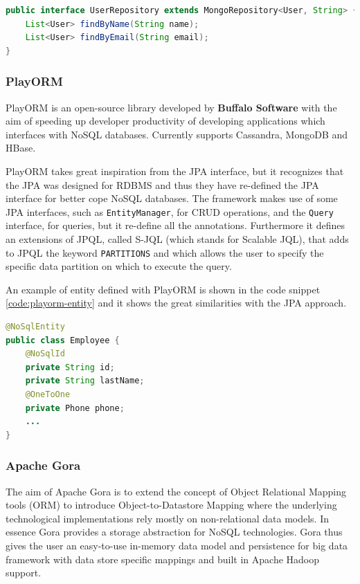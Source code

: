 \begin{lstlisting}[language=Java, caption=Spring Data repositories, label=code:spring-dao]
public interface UserRepository extends MongoRepository<User, String> {
    List<User> findByName(String name);
    List<User> findByEmail(String email);
}
\end{lstlisting}

\subsubsection{PlayORM}
PlayORM \cite{online:playorm} is an open-source library developed by \textbf{Buffalo Software} with the aim of speeding up developer productivity of developing applications which interfaces with NoSQL databases. Currently supports Cassandra, MongoDB and HBase. 

\noindent PlayORM takes great inspiration from the JPA interface, but it  recognizes that the JPA was designed for RDBMS and thus they have re-defined the JPA interface for better cope NoSQL databases.
The framework makes use of some JPA interfaces, such as \texttt{EntityManager}, for CRUD operations, and the \texttt{Query} interface, for queries, but it re-define all the annotations.
Furthermore it defines an extensions of JPQL, called S-JQL (which stands for Scalable JQL), that adds to JPQL the keyword \texttt{PARTITIONS} and which allows the user to specify the specific data partition on which to execute the query.

\noindent An example of entity defined with PlayORM is shown in the code snippet \ref{code:playorm-entity} and it shows the great similarities with the JPA approach.

\begin{lstlisting}[language=Java, caption=PlayORM object mapping, label=code:playorm-entity]
@NoSqlEntity
public class Employee {
    @NoSqlId
    private String id;
    private String lastName;
    @OneToOne
    private Phone phone;
    ...
}
\end{lstlisting}

\subsubsection{Apache Gora}
The aim of Apache Gora \cite{online:apache-gora} is to extend the concept of Object Relational Mapping tools (ORM) to introduce Object-to-Datastore Mapping where the underlying technological implementations rely mostly on non-relational data models. In essence Gora provides a storage abstraction for NoSQL technologies. 
Gora thus gives the user an easy-to-use in-memory data model and persistence for big data framework with data store specific mappings and built in Apache Hadoop support.


